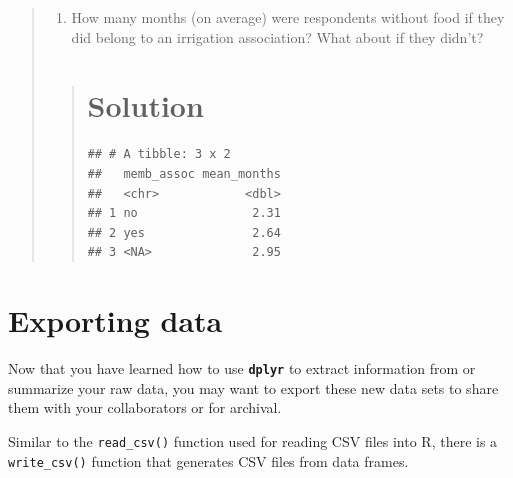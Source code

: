 \documentclass[]{book}
\newenvironment{Shaded}{\begin{snugshade}}{\end{snugshade}}
\newcommand{\KeywordTok}[1]{\textcolor[rgb]{0.13,0.29,0.53}{\textbf{#1}}}
\newcommand{\DataTypeTok}[1]{\textcolor[rgb]{0.13,0.29,0.53}{#1}}
\newcommand{\StringTok}[1]{\textcolor[rgb]{0.31,0.60,0.02}{#1}}
\newcommand{\OperatorTok}[1]{\textcolor[rgb]{0.81,0.36,0.00}{\textbf{#1}}}
\newcommand{\NormalTok}[1]{#1}
\providecommand{\tightlist}{%
  \setlength{\itemsep}{0pt}\setlength{\parskip}{0pt}}
\begin{document}
\begin{quote}
\begin{enumerate}
\def\labelenumi{\arabic{enumi}.}
\setcounter{enumi}{1}
\tightlist
\item
  How many months (on average) were respondents without food if they did
  belong to an irrigation association? What about if they didn't?
\end{enumerate}

\begin{quote}
\section{Solution}\label{solution-10}

\begin{Shaded}
\end{Shaded}

\begin{verbatim}
## # A tibble: 3 x 2
##   memb_assoc mean_months
##   <chr>            <dbl>
## 1 no                2.31
## 2 yes               2.64
## 3 <NA>              2.95
\end{verbatim}
\end{quote}
\end{quote}

\section{Exporting data}\label{exporting-data}

Now that you have learned how to use \textbf{\texttt{dplyr}} to extract
information from or summarize your raw data, you may want to export
these new data sets to share them with your collaborators or for
archival.

Similar to the \texttt{read\_csv()} function used for reading CSV files
into R, there is a \texttt{write\_csv()} function that generates CSV
files from data frames.
\end{document}
